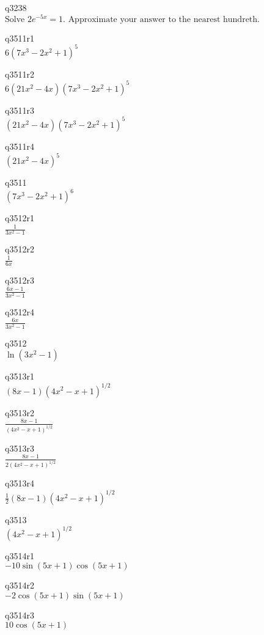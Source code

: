 q3238\\
\(\displaystyle \text{Solve } 2e^{-5x} = 1. \text{ Approximate your answer to the nearest hundreth.} \)

q3511r1\\
\(\displaystyle 6(7x^3 - 2x^2 + 1)^5 \)

q3511r2\\
\(\displaystyle 6(21x^2 - 4x)(7x^3 - 2x^2 + 1)^5 \)

q3511r3\\
\(\displaystyle (21x^2 - 4x)(7x^3 - 2x^2 + 1)^5 \)

q3511r4\\
\(\displaystyle (21x^2 - 4x)^5 \)

q3511\\
\(\displaystyle (7x^3 - 2x^2 + 1)^6 \)

q3512r1\\
\(\displaystyle \frac{1}{3x^2 - 1} \)

q3512r2\\
\(\displaystyle \frac{1}{6x} \)

q3512r3\\
\(\displaystyle \frac{6x-1}{3x^2-1} \)

q3512r4\\
\(\displaystyle \frac{6x}{3x^2 - 1} \)

q3512\\
\(\displaystyle \ln(3x^2 - 1) \)

q3513r1\\
\(\displaystyle (8x-1)(4x^2 - x + 1)^{1/2} \)

q3513r2\\
\(\displaystyle \frac{8x - 1}{(4x^2 - x + 1)^{1/2}} \)

q3513r3\\
\(\displaystyle \frac{8x - 1}{2(4x^2 - x + 1)^{1/2}} \)

q3513r4\\
\(\displaystyle \frac{1}{2}(8x - 1)(4x^2 - x + 1)^{1/2} \)

q3513\\
\(\displaystyle (4x^2 - x + 1)^{1/2} \)

q3514r1\\
\(\displaystyle -10\sin(5x + 1)\cos(5x + 1) \)

q3514r2\\
\(\displaystyle -2\cos(5x + 1)\sin(5x + 1) \)

q3514r3\\
\(\displaystyle 10\cos(5x + 1) \)

